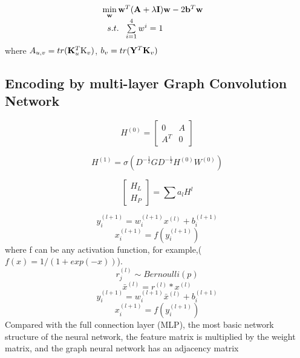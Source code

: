 \documentclass[fleqn,10pt]{wlscirep}
\begin{document}
\begin{equation}
\begin{array}{l}
\mathop {\min }\limits_{\bf{w}} {{\bf{w}}^T}({\bf{A}} + \lambda {\bf{I}}){\bf{w}} - 2{{\bf{b}}^T}{\bf{w}}{\kern 1pt} {\kern 1pt} {\kern 1pt} {\kern 1pt} {\kern 1pt} {\kern 1pt} {\kern 1pt} {\kern 1pt} {\kern 1pt} {\kern 1pt} \\
\;\;s.t.{\kern 1pt} \;\;\sum\limits_{i{\rm{ = 1}}}^{\rm{4}} {{w^i} = 1} 
\end{array}
\end{equation}
where ${A_{u,v}} = tr({\bf{K}}_u^T{{\bf{{\rm K}}}_v})$, ${b_v} = tr({{\bf{Y}}^T}{{\bf{K}}_v})$

\subsection*{Encoding by multi-layer Graph Convolution Network}

\begin{equation}
{H^{(0)}} = \left[ {\begin{array}{*{20}{c}}
0&A\\
{{A^T}}&0
\end{array}} \right]
\end{equation}

\begin{equation}
{H^{(1)}} = \sigma ({D^{ - \frac{1}{2}}}G{D^{ - \frac{1}{2}}}{H^{(0)}}{W^{(0)}})
\end{equation}

\begin{equation}
\left[ {\begin{array}{*{20}{c}}
{{H_L}}\\
{{H_P}}
\end{array}} \right] = \sum {{a_l}{H^l}}
\end{equation}

\begin{equation}
y_i^{(l + 1)} = w_i^{(l + 1)}{x^{(l)}} + b_i^{(l + 1)}
\end{equation}
\begin{equation}
x_i^{(l + 1)} = f(y_i^{(l + 1)})
\end{equation}
where f can be any activation function, for example,($f(x) = 1/(1+exp(-x))$).
\begin{equation}
r_j^{(l)} \sim Bernoulli(p)
\end{equation}
\begin{equation}
{\bar x^{(l)}} = {r^{(l)}}*{x^{(l)}}
\end{equation}
\begin{equation}
y_i^{(l + 1)} = w_i^{(l + 1)}{\bar x^{(l)}} + b_i^{(l + 1)}
\end{equation}
\begin{equation}
x_i^{(l + 1)} = f(y_i^{(l + 1)})
\end{equation}
Compared with the full connection layer (MLP), the most basic network structure of the neural network, the feature matrix is multiplied by the weight matrix, and the graph neural network has an adjacency matrix
\end{document}
